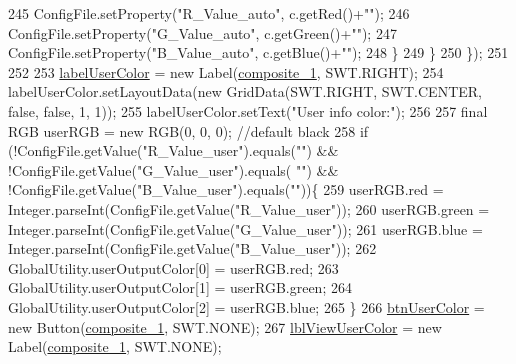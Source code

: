 \begin{DoxyCode}
245                       ConfigFile.setProperty(\textcolor{stringliteral}{"R\_Value\_auto"}, c.getRed()+\textcolor{stringliteral}{""});
246                       ConfigFile.setProperty(\textcolor{stringliteral}{"G\_Value\_auto"}, c.getGreen()+\textcolor{stringliteral}{""});
247                       ConfigFile.setProperty(\textcolor{stringliteral}{"B\_Value\_auto"}, c.getBlue()+\textcolor{stringliteral}{""});
248                   \}
249                 \}
250             \});
251         
252         
253         \hyperlink{classit_1_1isislab_1_1masonassisteddocumentation_1_1mason_1_1wizards_1_1_b___project_information_page_a0cc1d0856402dfcda75702e789c68733}{labelUserColor} = \textcolor{keyword}{new} Label(\hyperlink{classit_1_1isislab_1_1masonassisteddocumentation_1_1mason_1_1wizards_1_1_b___project_information_page_a89067957695a1743c11b64ff76f1e5c9}{composite\_1}, SWT.RIGHT);
254         labelUserColor.setLayoutData(\textcolor{keyword}{new} GridData(SWT.RIGHT, SWT.CENTER, \textcolor{keyword}{false}, \textcolor{keyword}{false}, 1, 1));
255         labelUserColor.setText(\textcolor{stringliteral}{"User info color:"});
256         
257         \textcolor{keyword}{final} RGB userRGB = \textcolor{keyword}{new} RGB(0, 0, 0);   \textcolor{comment}{//default black}
258         \textcolor{keywordflow}{if} (!ConfigFile.getValue(\textcolor{stringliteral}{"R\_Value\_user"}).equals(\textcolor{stringliteral}{""}) && !ConfigFile.getValue(\textcolor{stringliteral}{"G\_Value\_user"}).equals(\textcolor{stringliteral}{
      ""}) && !ConfigFile.getValue(\textcolor{stringliteral}{"B\_Value\_user"}).equals(\textcolor{stringliteral}{""}))\{
259             userRGB.red = Integer.parseInt(ConfigFile.getValue(\textcolor{stringliteral}{"R\_Value\_user"}));
260             userRGB.green = Integer.parseInt(ConfigFile.getValue(\textcolor{stringliteral}{"G\_Value\_user"}));
261             userRGB.blue = Integer.parseInt(ConfigFile.getValue(\textcolor{stringliteral}{"B\_Value\_user"}));
262             GlobalUtility.userOutputColor[0] = userRGB.red;
263             GlobalUtility.userOutputColor[1] = userRGB.green;
264             GlobalUtility.userOutputColor[2] = userRGB.blue;
265         \}
266         \hyperlink{classit_1_1isislab_1_1masonassisteddocumentation_1_1mason_1_1wizards_1_1_b___project_information_page_a0c0c20817602a22ba74f88744083be6b}{btnUserColor} = \textcolor{keyword}{new} Button(\hyperlink{classit_1_1isislab_1_1masonassisteddocumentation_1_1mason_1_1wizards_1_1_b___project_information_page_a89067957695a1743c11b64ff76f1e5c9}{composite\_1}, SWT.NONE);
267         \hyperlink{classit_1_1isislab_1_1masonassisteddocumentation_1_1mason_1_1wizards_1_1_b___project_information_page_abf3d5350bf4a246805afb445ef49380a}{lblViewUserColor} = \textcolor{keyword}{new} Label(\hyperlink{classit_1_1isislab_1_1masonassisteddocumentation_1_1mason_1_1wizards_1_1_b___project_information_page_a89067957695a1743c11b64ff76f1e5c9}{composite\_1}, SWT.NONE);

\end{DoxyCode}

